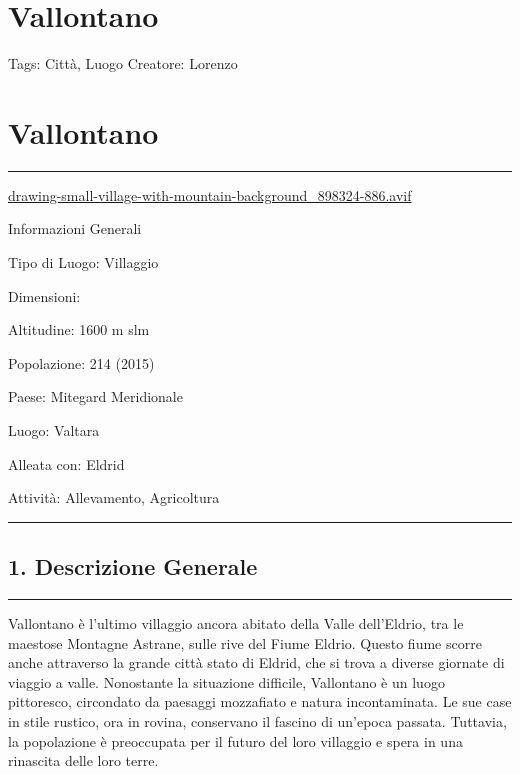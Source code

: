 \section{Vallontano}\label{vallontano}

Tags: Città, Luogo Creatore: Lorenzo

\section{Vallontano}\label{vallontano-1}

\begin{center}\rule{0.5\linewidth}{0.5pt}\end{center}

\url{drawing-small-village-with-mountain-background_898324-886.avif}

Informazioni Generali

Tipo di Luogo: Villaggio

Dimensioni:

Altitudine: 1600 m slm

Popolazione: 214 (2015)

Paese: Mitegard Meridionale

Luogo: Valtara

Alleata con: Eldrid

Attività: Allevamento, Agricoltura

\begin{center}\rule{0.5\linewidth}{0.5pt}\end{center}

\subsection{1. Descrizione Generale}\label{descrizione-generale}

\begin{center}\rule{0.5\linewidth}{0.5pt}\end{center}

Vallontano è l'ultimo villaggio ancora abitato della Valle dell'Eldrio,
tra le maestose Montagne Astrane, sulle rive del Fiume Eldrio. Questo
fiume scorre anche attraverso la grande città stato di Eldrid, che si
trova a diverse giornate di viaggio a valle. Nonostante la situazione
difficile, Vallontano è un luogo pittoresco, circondato da paesaggi
mozzafiato e natura incontaminata. Le sue case in stile rustico, ora in
rovina, conservano il fascino di un'epoca passata. Tuttavia, la
popolazione è preoccupata per il futuro del loro villaggio e spera in
una rinascita delle loro terre.

